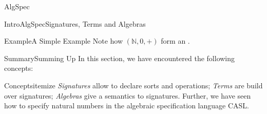 \documentclass[landscape, slides, light]{mmiss2}
\newcommand{\Nat}{\mbox{$\mathbb N$}} %
\begin{document}
\begin{Package}{AlgSpec}
\begin{Section}{IntroAlgSpec}{Signatures, Terms and Algebras}{}
\begin{Paragraph}{Example}{A Simple Example}{}
Note how $(\Nat, 0, +)$ form an .
\end{Paragraph}

\begin{Summary}{Summary}{Summing Up}{}
In this section, we have encountered the following concepts:
\begin{List}{Concepts}{itemize}{}
\ListItem{}
\emph{Signatures} allow to declare sorts and operations;
\ListItem{}
\emph{Terms} are build over signatures;
\ListItem{}
\emph{Algebras} give a semantics to signatures.
\ListItem{}
Further, we have seen how to specify natural numbers in the algebraic
specification language CASL.
\end{List}
\end{Summary}


  
\end{Section}


\end{Package}
\end{document}

